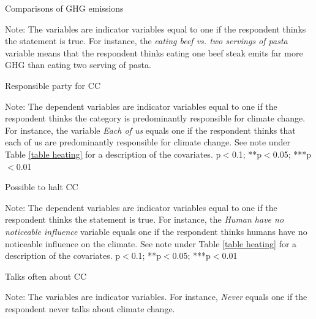 \documentclass{article}
\begin{document}
\begin{table}[h!]
	\caption{Comparisons of GHG emissions}
	\begin{center}
		\scalebox{0.7}{}
	\end{center}
	{\footnotesize Note: The variables are indicator variables equal to one if the respondent thinks the statement is true. For instance, the \textit{eating beef vs. two servings of pasta} variable means that the respondent thinks eating one beef steak emits far more GHG than eating two serving of pasta. }
\end{table}		

\begin{landscape}
	\begin{table}[h!]
		\caption{Responsible party for CC}
		\begin{center}
			\scalebox{0.6}{}
		\end{center}
	{\footnotesize Note: The dependent variables are indicator variables equal to one if the respondent thinks the category is predominantly responsible for climate change. For instance, the variable \textit{Each of us} equals one if the respondent thinks that each of us are predominantly responsible for climate change. See note under Table \ref{table heating} for a description of the covariates.
	\newline *p$<$0.1; **p$<$0.05; ***p$<$0.01}
	\end{table}		
\end{landscape}

\begin{landscape}
	\begin{table}[h!]
		\caption{Possible to halt CC}
		\begin{center}
			\scalebox{0.6}{}
		\end{center}
	{\footnotesize Note: The dependent variables are indicator variables equal to one if the respondent thinks the statement is true. For instance, the \textit{Human have no noticeable influence} variable equals one if the respondent thinks humans have no noticeable influence on the climate. See note under Table \ref{table heating} for a description of the covariates.
	\newline *p$<$0.1; **p$<$0.05; ***p$<$0.01}
	\end{table}		
\end{landscape}

\begin{table}[h!]
	\caption{Talks often about CC}
	\begin{center}
		\scalebox{0.8}{}
	\end{center}
	{\footnotesize Note: The variables are indicator variables. For instance, \textit{Never} equals one if the respondent never talks about climate change.}
\end{table}		
\end{document}
